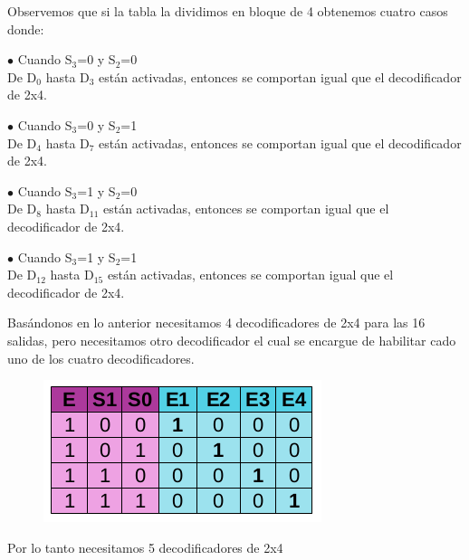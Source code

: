 \documentclass[11pt,letterpaper]{article}
\begin{document}
\begin{itemize}
			Observemos que si la tabla la dividimos en bloque de 4 obtenemos cuatro casos donde:
			
			$\bullet$ Cuando S$_3$=0 y S$_2$=0\\
			De D$_0$ hasta D$_3$ están activadas, entonces se comportan igual que el decodificador de 2x4.
			
			$\bullet$ Cuando S$_3$=0 y S$_2$=1\\
			De D$_4$ hasta D$_7$ están activadas, entonces se comportan igual que el decodificador de 2x4.
			
			$\bullet$ Cuando S$_3$=1 y S$_2$=0\\
			De D$_8$ hasta D$_11$ están activadas, entonces se comportan igual que el decodificador de 2x4.
			
			$\bullet$ Cuando S$_3$=1 y S$_2$=1\\
			De D$_12$ hasta D$_15$ están activadas, entonces se comportan igual que el decodificador de 2x4.	
			
			Basándonos en lo anterior necesitamos 4 decodificadores de 2x4 para las 16 salidas, pero necesitamos otro decodificador el cual se encargue de habilitar cado uno de los cuatro decodificadores.
			
			\begin{figure}[h!]
				\centering
				\includegraphics[scale=0.4]{4.png}
			\end{figure}
		
		Por lo tanto necesitamos 5 decodificadores de 2x4\\
			
		\end{itemize}
\end{document}
